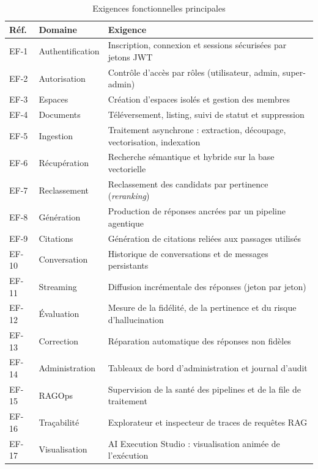 \begin{table}[H]
\centering\caption{Exigences fonctionnelles principales}\label{tab:ef}\small
\begin{tabularx}{\textwidth}{@{}l l X@{}}
\toprule
\textbf{Réf.} & \textbf{Domaine} & \textbf{Exigence} \\
\midrule
EF-1 & Authentification & Inscription, connexion et sessions sécurisées par jetons JWT \\
EF-2 & Autorisation & Contrôle d'accès par rôles (utilisateur, admin, super-admin) \\
EF-3 & Espaces & Création d'espaces isolés et gestion des membres \\
EF-4 & Documents & Téléversement, listing, suivi de statut et suppression \\
EF-5 & Ingestion & Traitement asynchrone : extraction, découpage, vectorisation, indexation \\
EF-6 & Récupération & Recherche sémantique et hybride sur la base vectorielle \\
EF-7 & Reclassement & Reclassement des candidats par pertinence (\emph{reranking}) \\
EF-8 & Génération & Production de réponses ancrées par un pipeline agentique \\
EF-9 & Citations & Génération de citations reliées aux passages utilisés \\
EF-10 & Conversation & Historique de conversations et de messages persistants \\
EF-11 & Streaming & Diffusion incrémentale des réponses (jeton par jeton) \\
EF-12 & Évaluation & Mesure de la fidélité, de la pertinence et du risque d'hallucination \\
EF-13 & Correction & Réparation automatique des réponses non fidèles \\
EF-14 & Administration & Tableaux de bord d'administration et journal d'audit \\
EF-15 & RAGOps & Supervision de la santé des pipelines et de la file de traitement \\
EF-16 & Traçabilité & Explorateur et inspecteur de traces de requêtes RAG \\
EF-17 & Visualisation & AI Execution Studio : visualisation animée de l'exécution \\
\bottomrule
\end{tabularx}
\end{table}

